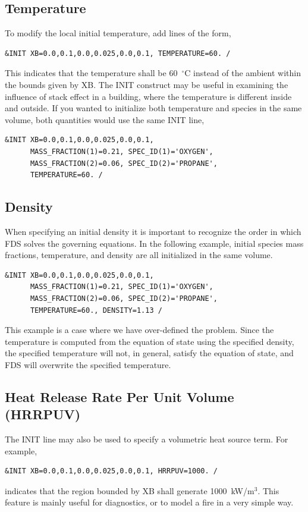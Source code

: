 \documentclass[11pt]{book}
\begin{document}
\subsection*{Temperature}

To modify the local initial temperature, add lines of the form,
\begin{lstlisting}
&INIT XB=0.0,0.1,0.0,0.025,0.0,0.1, TEMPERATURE=60. /
\end{lstlisting}
This indicates that the temperature shall be 60~$^\circ$C instead of the ambient within the bounds given by {\ct XB}. The {\ct INIT} construct may be useful in examining the influence of stack effect in a building, where the temperature is different inside and outside. If you wanted to initialize both temperature and species in the same volume, both quantities would use the same {\ct INIT} line,
\begin{lstlisting}
&INIT XB=0.0,0.1,0.0,0.025,0.0,0.1,
      MASS_FRACTION(1)=0.21, SPEC_ID(1)='OXYGEN',
      MASS_FRACTION(2)=0.06, SPEC_ID(2)='PROPANE',
      TEMPERATURE=60. /
\end{lstlisting}

\subsection*{Density}

When specifying an initial density it is important to recognize the order in which FDS solves the governing equations. In the following example, initial species mass fractions, temperature, and density are all initialized in the same volume.
\begin{lstlisting}
&INIT XB=0.0,0.1,0.0,0.025,0.0,0.1,
      MASS_FRACTION(1)=0.21, SPEC_ID(1)='OXYGEN',
      MASS_FRACTION(2)=0.06, SPEC_ID(2)='PROPANE',
      TEMPERATURE=60., DENSITY=1.13 /
\end{lstlisting}
This example is a case where we have over-defined the problem. Since the temperature is computed from the equation of state using the specified density, the specified temperature will not, in general, satisfy the equation of state, and FDS will overwrite the specified temperature.

\subsection*{Heat Release Rate Per Unit Volume (HRRPUV)}

The {\ct INIT} line may also be used to specify a volumetric heat source term. For example,
\begin{lstlisting}
&INIT XB=0.0,0.1,0.0,0.025,0.0,0.1, HRRPUV=1000. /
\end{lstlisting}
indicates that the region bounded by {\ct XB} shall generate 1000~kW/m$^3$. This feature is mainly useful for diagnostics, or to model a fire in a very simple way.
\end{document}

